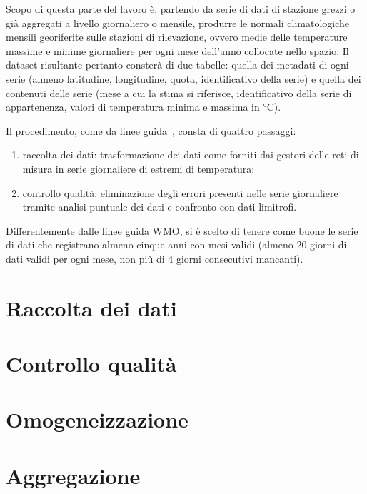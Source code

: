 
Scopo di questa parte del lavoro è, partendo da serie di dati di stazione grezzi o già aggregati a livello giornaliero o mensile, produrre le normali climatologiche mensili georiferite sulle stazioni di rilevazione, ovvero medie delle temperature massime e minime giornaliere per ogni mese dell'anno collocate nello spazio. Il dataset risultante pertanto consterà di due tabelle: quella dei metadati di ogni serie (almeno latitudine, longitudine, quota, identificativo della serie) e quella dei contenuti delle serie (mese a cui la stima si riferisce, identificativo della serie di appartenenza, valori di temperatura minima e massima in \(\unit{\degreeCelsius}\)).

Il procedimento, come da linee guida~\cite{WMOGuidelinesNormalsCalculation2017}, consta di quattro passaggi:

\begin{enumerate}
  \item raccolta dei dati: trasformazione dei dati come forniti dai gestori
    delle reti di misura in serie giornaliere di estremi di temperatura;
  \item controllo qualità: eliminazione degli errori presenti nelle serie
    giornaliere tramite analisi puntuale dei dati e confronto con dati
    limitrofi.
\end{enumerate}

Differentemente dalle linee guida WMO, si è scelto di tenere come buone le serie di dati che registrano almeno cinque anni con mesi validi (almeno 20 giorni di dati validi per ogni mese, non più di 4 giorni consecutivi mancanti).

\section{Raccolta dei dati}\label{ch:raccolta-dati}


\section{Controllo qualità}\label{ch:qc}


\section{Omogeneizzazione}\label{ch:homo}


\section{Aggregazione}\label{ch:aggregazione}
